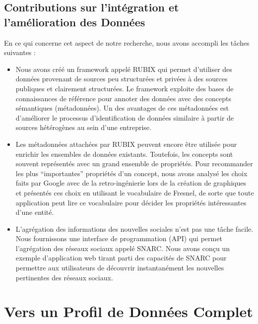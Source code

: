 \subsection{Contributions sur l'int\'{e}gration et l'am\'{e}lioration des Donn\'{e}es}

En ce qui concerne cet aspect de notre recherche, nous avons accompli les tâches suivantes :
\begin{itemize}
\item Nous avons cr\'{e}\'{e} un framework appel\'{e} RUBIX qui permet d'utiliser des donn\'{e}es provenant de sources peu structur\'{e}es et priv\'{e}es \`{a} des sources publiques et clairement structur\'{e}es. Le framework exploite des bases de connaissances de r\'{e}f\'{e}rence pour annoter des donn\'{e}es avec des concepts s\'{e}mantiques (m\'{e}tadonn\'{e}es). Un des avantages de ces m\'{e}tadonn\'{e}es est d'am\'{e}liorer le processus d'identification de donn\'{e}es similaire \`{a} partir de sources h\'{e}t\'{e}rog\`{e}nes au sein d'une entreprise.
\item Les m\'{e}tadonn\'{e}es attach\'{e}es par RUBIX peuvent encore \^{e}tre utilis\'{e}e pour enrichir les ensembles de donn\'{e}es existants. Toutefois, les concepts sont souvent repr\'{e}sent\'{e}s avec un grand ensemble de propri\'{e}t\'{e}s. Pour recommander les plus ``importantes'' propri\'{e}t\'{e}s d'un concept, nous avons analys\'{e} les choix faits par Google avec de la retro-ing\'{e}nierie lors de la cr\'{e}ation de graphiques et pr\'{e}sent\'{e}s ces choix en utilisant le vocabulaire de Fresnel, de sorte que toute application peut lire ce vocabulaire pour d\'{e}cider les propri\'{e}t\'{e}s int\'{e}ressantes d'une entit\'{e}.
\item L'agr\'{e}gation des informations des nouvelles sociales n'est pas une tâche facile. Nous fournissons une interface de programmation (API) qui permet l'agr\'{e}gation des r\'{e}seaux sociaux appel\'{e} SNARC. Nous avons conçu un exemple d'application web tirant parti des capacit\'{e}s de SNARC pour permettre aux utilisateurs de d\'{e}couvrir instantan\'{e}ment les nouvelles pertinentes des r\'{e}seaux sociaux.
\end{itemize}

\let\cleardoublepage\clearpage\let\cleardoublepage\clearpage
\section{Vers un Profil de Donn\'{e}es Complet}

